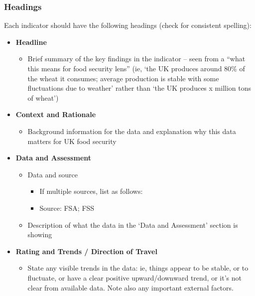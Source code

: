\documentclass[
]{book}
\providecommand{\tightlist}{%
  \setlength{\itemsep}{0pt}\setlength{\parskip}{0pt}}
\begin{document}
\hypertarget{headings}{%
\subsubsection{Headings}\label{headings}}

Each indicator should have the following headings (check for consistent spelling):

\begin{itemize}
\item
  \textbf{Headline}

  \begin{itemize}
  \tightlist
  \item
    Brief summary of the key findings in the indicator -- seen from a ``what this means for food security lens'' (ie, `the UK produces around 80\% of the wheat it consumes; average production is stable with some fluctuations due to weather' rather than `the UK produces x million tons of wheat')
  \end{itemize}
\item
  \textbf{Context and Rationale}

  \begin{itemize}
  \tightlist
  \item
    Background information for the data and explanation why this data matters for UK food security
  \end{itemize}
\item
  \textbf{Data and Assessment}

  \begin{itemize}
  \tightlist
  \item
    Data and source

    \begin{itemize}
    \tightlist
    \item
      If multiple sources, list as follows:\\
    \item
      Source: FSA; FSS
    \end{itemize}
  \item
    Description of what the data in the `Data and Assessment' section is showing
  \end{itemize}
\item
  \textbf{Rating and Trends / Direction of Travel}

  \begin{itemize}
  \tightlist
  \item
    State any visible trends in the data: ie, things appear to be stable, or to fluctuate, or have a clear positive upward/downward trend, or it's not clear from available data. Note also any important external factors.
  \end{itemize}
\end{itemize}
\end{document}
